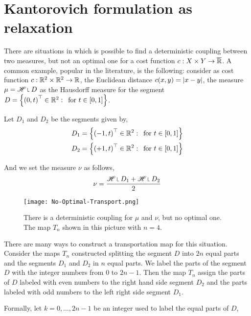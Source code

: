 \section{Kantorovich formulation as relaxation}

There are situations in which is possible to find a deterministic coupling between two measures, but not an optimal one for a cost function $c:X\times Y \rightarrow \overline{\mathbb{R}}$. A common example, popular in the literature, is the following: consider as cost function $c:\mathbb{R}^2\times\mathbb{R}^2 \rightarrow \mathbb{R}$, the Euclidean distance $c(x,y)=\left| x-y \right|$, the measure $\mu=\Hausdorff\measurerestr D$ as the Hausdorff measure for the segment  $D=\left\lbrace \left( 0, t \right)^\top \in \mathbb{R}^2:\, \text{ for } t\in [0,1] \right\rbrace$. 

Let $D_1$ and $D_2$ be the segments given by,
\begin{align*}
D_1 = \left\lbrace \left( -1, t \right)^\top\in\mathbb{R}^2:\, \text{ for } t\in [0,1] \right\rbrace \\
D_2 = \left\lbrace \left( +1, t \right)^\top\in\mathbb{R}^2:\, \text{ for } t\in [0,1] \right\rbrace
\end{align*}

And we set the measure $\nu$ as follows, 
\begin{equation*}
\nu=\frac{\Hausdorff\measurerestr D_1 + \Hausdorff \measurerestr D_2}{2}
\end{equation*}

\begin{figure}[H]
	\begin{center}
	\texttt{[image: No-Optimal-Transport.png]}
	\caption{There is a deterministic coupling for $\mu$ and $\nu$, but no optimal one. The map $T_n$ shown in this picture with $n=4$.}	
	\end{center}

\end{figure}


There are many ways to construct a transportation map for this situation. Consider the maps $T_n$ constructed splitting the segment $D$ into $2n$ equal parts and the segments $D_1$ and $D_2$ in $n$ equal parts. We label the parts of the segment $D$ with the integer numbers from $0$ to $2n-1$. Then the map $T_n$ assign the parts of $D$ labeled with even numbers to the right hand side segment $D_2$ and the parts labeled with odd numbers to the left right side segment $D_1$. 

Formally, let $k=0, \dots, 2n-1$ be an integer used to label the equal parts of $D$,

